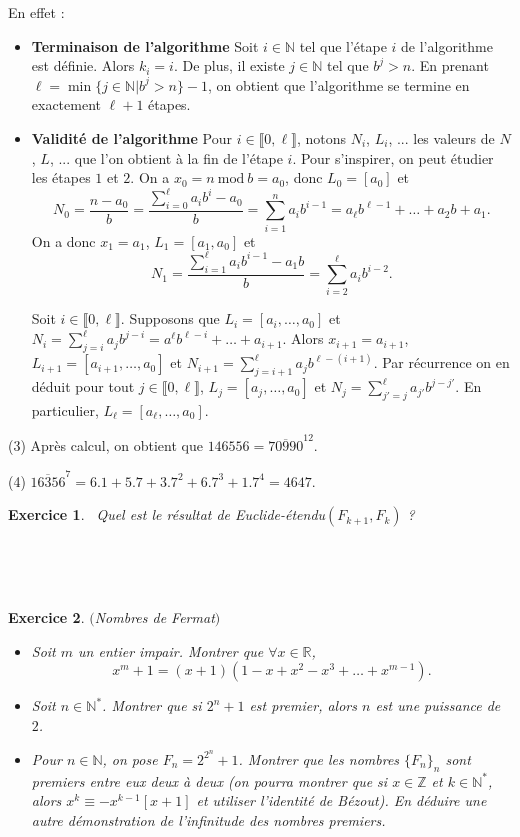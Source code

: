 \documentclass[11pt,a4paper]{article}
\newtheorem{ex}{Exercice}
\newcommand{\N}{\mathbb{N}}
\newcommand{\Z}{\mathbb{Z}}
\begin{document}
En effet : \begin{itemize}
\item[•] \textbf{Terminaison de l'algorithme}  Soit $i\in \N$ tel que l'étape $i$ de l'algorithme est définie. Alors $k_i=i$. De plus, il existe $j\in \N$ tel que $b^j>n$. En prenant $\ell=\min\{ j\in \N|b^j>n\}-1$, on obtient que l'algorithme se termine en exactement $\ell+1$ étapes.

\item[•] \textbf{Validité de l'algorithme} Pour $i\in \llbracket 0,\ell\rrbracket$, notons $N_i$, $L_i$, ... les valeurs de  $N$, $L$, ... que l'on obtient à la fin de l'étape $i$. Pour s'inspirer, on peut étudier les étapes $1$ et $2$.  On a   $x_0=n\mathrm{\ mod\ }b=a_0$, donc $L_0=[a_0]$ et \[N_0=\frac{n-a_0}{b}=\frac{\sum_{i=0}^\ell a_i b^i-a_0}{b}=\sum_{i=1}^n a_i b^{i-1}=a_\ell b^{\ell-1}+\ldots + a_2 b+ a_1.\] On a donc $x_1=a_1$, $L_1=[a_1,a_0]$ et \[N_1=\frac{\sum_{i=1}^\ell a_i b^{i-1}-a_1 b}{b}=\sum_{i=2}^\ell a_i b^{i-2}.\]

    Soit $i\in \llbracket 0,\ell\rrbracket$. Supposons  que $L_i=[a_i,\ldots,a_0]$ et $N_i=\sum_{j=i}^\ell a_j b^{j-i}=a^\ell b^{\ell-i}+\ldots + a_{i+1}$. Alors $x_{i+1}=a_{i+1}$, $L_{i+1}=[a_{i+1},\ldots,a_0]$ et $N_{i+1}=\sum_{j=i+1}^\ell a_j b^{\ell-(i+1)}$. Par récurrence on en déduit pour tout $j\in \llbracket 0,\ell\rrbracket$, $L_j=[a_j,\ldots,a_0]$ et $N_j=\sum_{j'=j}^{\ell} a_{j'} b^{j-j'}$. En particulier, $L_\ell=[a_\ell,\ldots,a_0]$.
\end{itemize}

(3) Après calcul, on obtient que $146556=\overline{70990}^{12}$.

(4) $\overline{16356}^7=6.1+5.7+3.7^2+6.7^3+1.7^4=4647$.

\begin{ex}\label{exEuclide_etendu_fibonnacci}\
Quel est le résultat de Euclide-étendu$(F_{k+1},F_k)$ ?
\end{ex}

\


\

\begin{ex}\label{exNombres_Fermat}$($Nombres de Fermat$)$
\begin{itemize}
\item[$1.$] Soit $m$ un entier impair. Montrer que $\forall x \in \mathbb{R}$, 
$$ x^m+1=(x+1)(1-x+x^2-x^3+\ldots + x^{m-1}).$$
\item[$2.$] Soit $n \in \mathbb{N}^*$. Montrer que si $2^n+1$ est premier, alors $n$ est une puissance de $2$.%
\item[$3.$] Pour $n \in \mathbb{N}$, on pose $F_n=2^{2^{n}}+1$. Montrer que les nombres $\{ F_n \}_n$ sont premiers entre eux deux à deux (on pourra montrer que si $x\in \Z$ et $k\in \N^*$, alors $x^k\equiv -x^{k-1} [x+1]$ et utiliser l'identité de Bézout). En déduire une autre  démonstration de l'infinitude des nombres premiers. 
\end{itemize}
\end{ex}
\end{document}
